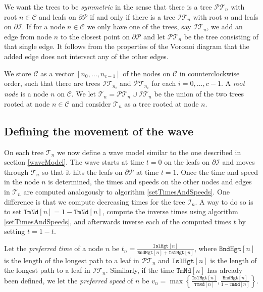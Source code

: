 \documentclass[3p]{elsarticle}
\newcommand{\PP}{\mathcal{P}}
\newcommand{\HH}{\mathcal{I}}
\newcommand{\CC}{\mathcal{C}}
\newcommand{\TT}{\mathcal{T}}
\newcommand{\PT}{\PP\TT}
\newcommand{\HT}{\HH\TT}
\newcommand{\ttimeO}{\texttt{TmNd}}
\newcommand{\height}{\texttt{Hgt}}
\newcommand{\holeHeight}{\texttt{Isl}\height}
\newcommand{\boundaryHeight}{\texttt{Bnd}\height}
\begin{document}
We want the trees to be \emph{symmetric} in the sense
that there is a tree $\PT_n$ with root $n\in\CC$ and leafs on $\partial\PP$ if and only if
there is a tree $\HT_n$ with root $n$ and leafs on $\partial\HH$. If for a node $n\in\CC$
we only have one of the trees, say $\HT_n$,
we add an edge from node $n$ to the closest point on $\partial\PP$ and let
$\PT_n$ be the tree consisting of that single edge.
It follows from the properties of the Voronoi diagram that the added edge does not intersect any of the
other edges.

We store $\CC$ as a vector $[n_0,\ldots,n_{c-1}]$ of the nodes on $\CC$
in counterclockwise order, such that there are trees $\HT_{n_i}$ and $\PT_{n_i}$ for each
$i=0,\ldots,c-1$.
A \emph{root node} is a node $n$ on $\CC$.
We let
$\TT_n=\PT_n\cup\HT_n$ be the union of the two trees rooted at node $n\in\CC$
and consider $\TT_n$ as a tree rooted at node $n$.

\subsection{Defining the movement of the wave}\label{defMovement}

On each tree $\TT_n$ we now define a wave model similar to the one described
in section \ref{waveModel}.
The wave starts at time $t=0$ on the leafs on $\partial\HH$ and moves through $\TT_n$ so that
it hits the leafs on $\partial\PP$ at time $t=1$.
Once the time and speed in the node $n$ is determined, the
times and speeds on the other nodes and edges in $\TT_n$ are computed analogously to
algorithm \ref{setTimesAndSpeeds}. One difference is that we compute decreasing times
for the tree $\HH_n$. A way to do so is to set $\ttimeO[n]=1-\ttimeO[n]$,
compute the inverse times using algorithm \ref{setTimesAndSpeeds}, and
afterwards inverse each of the computed times $t$ by setting $t=1-t$.

Let the \emph{preferred time} of a node $n$ be
$t_n=\frac{\holeHeight[n]}{\boundaryHeight[n] + \holeHeight[n]}$,
where $\boundaryHeight[n]$ is the length of the longest path to a leaf in $\PT_n$ and
$\holeHeight[n]$ is the length of the longest path to a leaf in $\HT_n$.
Similarly, if the time $\ttimeO[n]$ has already been defined,
we let the \emph{preferred speed} of $n$ be
$v_n=\max\left\{\frac{\holeHeight[n]}{\ttimeO[n]},
\frac{\boundaryHeight[n]}{1-\ttimeO[n]}\right\}$.
\end{document}
